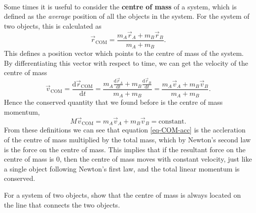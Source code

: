 \documentclass[../classical_mechanics.tex]{subfiles}
\begin{document}
        \paragraph{}
        Some times it is useful to consider the \textbf{centre of mass} of a system, which is defined as the \textit{average} position of all the objects in the system.
        For the system of two objects, this is calculated as
        \begin{equation}
            \vec{r}_\text{COM}=\frac{m_A\vec{r}_A + m_B\vec{r}_B}{m_A + m_B}.
        \end{equation}
        This defines a position vector which points to the centre of mass of the system.
        By differentiating this vector with respect to time, we can get the velocity of the centre of mass
        \begin{equation}
            \vec{v}_\text{COM}=\frac{\mathrm{d}\vec{r}_\text{COM}}{\mathrm{d}t}=\frac{m_A\frac{\mathrm{d}\vec{r}_A}{\mathrm{d}t} + m_B\frac{\mathrm{d}\vec{r}_B}{\mathrm{d}t}}{m_A + m_B}=\frac{m_A\vec{v}_A + m_B\vec{v}_B}{m_A + m_B}.
        \end{equation}
        Hence the conserved quantity that we found before is the centre of mass momentum,
        \begin{equation}
            M\vec{v}_\text{COM}=m_A\vec{v}_A+m_B\vec{v}_B=\text{constant}.
        \end{equation}
        From these definitions we can see that equation \ref{eq-COM-acc} is the accleration of the centre of mass multiplied by the total mass, which by Newton's second law is the force on the centre of mass.
        This implies that if the resultant force on the centre of mass is 0, then the centre of mass moves with constant velocity, just like a single object following Newton's first law, and the total linear momentum is conserved.
        \begin{example}
            For a system of two objects, show that the centre of mass is always located on the line that connects the two objects.
        \end{example}
\end{document}
